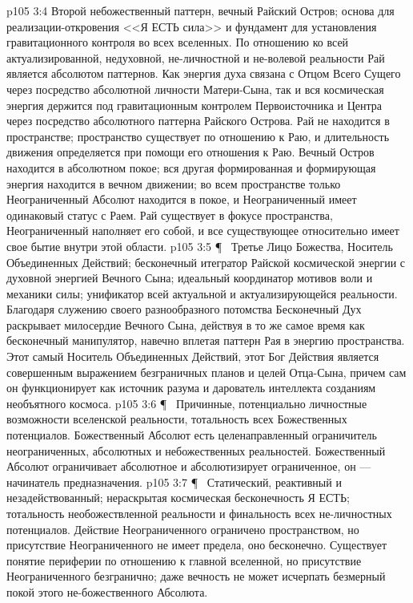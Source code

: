 \vs p105 3:4 \bibnobreakspace {} Второй небожественный паттерн, вечный Райский Остров; основа для реализации\hyp{}откровения <<Я ЕСТЬ сила>> и фундамент для установления гравитационного контроля во всех вселенных. По отношению ко всей актуализированной, недуховной, не\hyp{}личностной и не\hyp{}волевой реальности Рай является абсолютом паттернов. Как энергия духа связана с Отцом Всего Сущего через посредство абсолютной личности Матери\hyp{}Сына, так и вся космическая энергия держится под гравитационным контролем Первоисточника и Центра через посредство абсолютного паттерна Райского Острова. Рай не находится в пространстве; пространство существует по отношению к Раю, и длительность движения определяется при помощи его отношения к Раю. Вечный Остров находится в абсолютном покое; вся другая формированная и формирующая энергия находится в вечном движении; во всем пространстве только Неограниченный Абсолют находится в покое, и Неограниченный имеет одинаковый статус с Раем. Рай существует в фокусе пространства, Неограниченный наполняет его собой, и все существующее относительно имеет свое бытие внутри этой области.
\vs p105 3:5 \P\ \bibnobreakspace {} Третье Лицо Божества, Носитель Объединенных Действий; бесконечный итегратор Райской космической энергии с духовной энергией Вечного Сына; идеальный координатор мотивов воли и механики силы; унификатор всей актуальной и актуализирующейся реальности. Благодаря служению своего разнообразного потомства Бесконечный Дух раскрывает милосердие Вечного Сына, действуя в то же самое время как бесконечный манипулятор, навечно вплетая паттерн Рая в энергию пространства. Этот самый Носитель Объединенных Действий, этот Бог Действия является совершенным выражением безграничных планов и целей Отца\hyp{}Сына, причем сам он функционирует как источник разума и дарователь интеллекта созданиям необъятного космоса.
\vs p105 3:6 \P\ \bibnobreakspace {} Причинные, потенциально личностные возможности вселенской реальности, тотальность всех Божественных потенциалов. Божественный Абсолют есть целенаправленный ограничитель неограниченных, абсолютных и небожественных реальностей. Божественный Абсолют ограничивает абсолютное и абсолютизирует ограниченное, он --- начинатель предназначения.
\vs p105 3:7 \P\ \bibnobreakspace {} Статический, реактивный и незадействованный; нераскрытая космическая бесконечность Я ЕСТЬ; тотальность необожествленной реальности и финальность всех не\hyp{}личностных потенциалов. Действие Неограниченного ограничено пространством, но присутствие Неограниченного не имеет предела, оно бесконечно. Существует понятие периферии по отношению к главной вселенной, но присутствие Неограниченного безгранично; даже вечность не может исчерпать безмерный покой этого не\hyp{}божественного Абсолюта.
